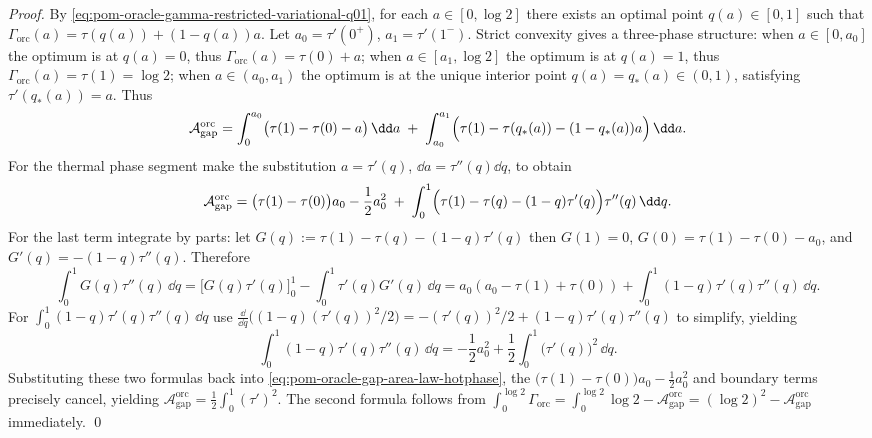 \begin{proof}
By \eqref{eq:pom-oracle-gamma-restricted-variational-q01}, for each \(a\in[0,\log 2]\) there exists an optimal point \(q(a)\in[0,1]\) such that
\(
\Gamma_{\mathrm{orc}}(a)=\tau(q(a))+(1-q(a))a
\).
Let \(a_0=\tau'(0^+)\), \(a_1=\tau'(1^-)\).
Strict convexity gives a three-phase structure: when \(a\in[0,a_0]\) the optimum is at \(q(a)=0\), thus \(\Gamma_{\mathrm{orc}}(a)=\tau(0)+a\);
when \(a\in[a_1,\log 2]\) the optimum is at \(q(a)=1\), thus \(\Gamma_{\mathrm{orc}}(a)=\tau(1)=\log 2\);
when \(a\in(a_0,a_1)\) the optimum is at the unique interior point \(q(a)=q_*(a)\in(0,1)\), satisfying \(\tau'(q_*(a))=a\).
Thus
\[
\mathcal{A}^{\mathrm{orc}}_{\mathrm{gap}}
=\int_{0}^{a_0}\bigl(\tau(1)-\tau(0)-a\bigr)\,\dd a
\;+\;
\int_{a_0}^{a_1}\Bigl(\tau(1)-\tau(q_*(a))-(1-q_*(a))a\Bigr)\,\dd a.
\]
For the thermal phase segment make the substitution \(a=\tau'(q)\), \(\dd a=\tau''(q)\dd q\), to obtain
\begin{equation}\label{eq:pom-oracle-gap-area-law-hotphase}
\mathcal{A}^{\mathrm{orc}}_{\mathrm{gap}}
=\bigl(\tau(1)-\tau(0)\bigr)a_0-\frac12a_0^2
\;+\;
\int_{0}^{1}\Bigl(\tau(1)-\tau(q)-(1-q)\tau'(q)\Bigr)\tau''(q)\,\dd q.
\end{equation}
For the last term integrate by parts: let
\(
G(q):=\tau(1)-\tau(q)-(1-q)\tau'(q)
\)
then \(G(1)=0\), \(G(0)=\tau(1)-\tau(0)-a_0\), and \(G'(q)=-(1-q)\tau''(q)\).
Therefore
\[
\int_{0}^{1}G(q)\tau''(q)\,\dd q
=\bigl[G(q)\tau'(q)\bigr]_{0}^{1}-\int_{0}^{1}\tau'(q)G'(q)\,\dd q
=a_0(a_0-\tau(1)+\tau(0))+\int_{0}^{1}(1-q)\tau'(q)\tau''(q)\,\dd q.
\]
For \(\int_{0}^{1}(1-q)\tau'(q)\tau''(q)\,\dd q\) use
\(
\frac{\dd}{\dd q}\bigl((1-q)(\tau'(q))^2/2\bigr)=-(\tau'(q))^2/2+(1-q)\tau'(q)\tau''(q)
\)
to simplify, yielding
\[
\int_{0}^{1}(1-q)\tau'(q)\tau''(q)\,\dd q
=-\frac12a_0^2+\frac12\int_{0}^{1}\bigl(\tau'(q)\bigr)^2\,\dd q.
\]
Substituting these two formulas back into \eqref{eq:pom-oracle-gap-area-law-hotphase}, the \(\bigl(\tau(1)-\tau(0)\bigr)a_0-\frac12a_0^2\) and boundary terms precisely cancel, yielding
\(
\mathcal{A}^{\mathrm{orc}}_{\mathrm{gap}}=\frac12\int_{0}^{1}(\tau')^2
\).
The second formula follows from
\(
\int_0^{\log 2}\Gamma_{\mathrm{orc}}=\int_0^{\log 2}\log 2-\mathcal{A}^{\mathrm{orc}}_{\mathrm{gap}}
=(\log 2)^2-\mathcal{A}^{\mathrm{orc}}_{\mathrm{gap}}
\)
immediately. \qed
\end{proof}

